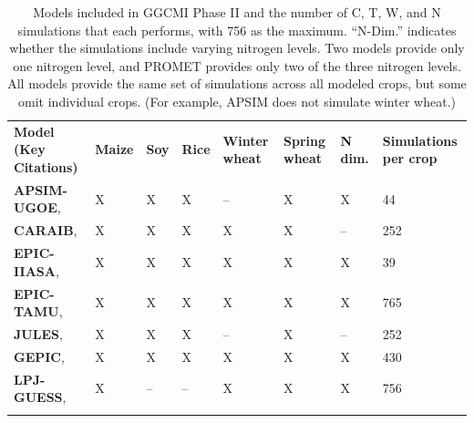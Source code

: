 \documentclass[esd, manuscript]{copernicus} %
\begin{document}
\begin{table}[t]
\caption{Models included in GGCMI Phase II and the number of C, T, W, and N simulations that each performs, with 756 as the maximum. ``N-Dim.'' indicates whether the simulations include varying nitrogen levels. Two models provide only one nitrogen level, and \dag PROMET provides only two of the three nitrogen levels. All models provide the same set of simulations across all modeled crops, but some omit individual crops. (For example, APSIM does not simulate winter wheat.)}
\label{table:models}
	\begin{tabular}{p{6cm} p{1cm} p{1cm} p{1cm} p{1cm} p{1cm} p{1cm} p{1.5cm}}
        \tophline
        {\textbf{Model (Key Citations)}}&{\textbf{Maize}}&{\textbf{Soy}}&{\textbf{Rice}}&{\textbf{Winter wheat}}&{\textbf{Spring wheat}}&{\textbf{N dim.}}&{\textbf{Simulations per crop}}\\ \middlehline
        {\textbf{APSIM-UGOE},    \citet{KEATING2003267, HOLZWORTH2014327}} & {X} & {X} & {X} & {--} & {X} & {X} & {44}\\ \middlehline
        {\textbf{CARAIB},        \citet{Dury2011, Pirttioja2015}} & {X} & {X} & {X} & {X} & {X} & {--} & {252}\\ \middlehline
        {\textbf{EPIC-IIASA},    \citet{BALKOVIC2014}} & {X} & {X} & {X} & {X} & {X} & {X} & {39}\\  \middlehline
        {\textbf{EPIC-TAMU},     \citet{Izaurralde06}} & {X} & {X} & {X} & {X} & {X} & {X} & {765}\\ \middlehline
        {\textbf{JULES},        \citet{Osborne2015, Williams2015, Williams2017}} & {X} & {X} & {X} & {--} & {X} & {--} & {252}\\ \middlehline
        {\textbf{GEPIC},         \citet{LIU2007478, FOLBERTH201221}} & {X} & {X} & {X} & {X} & {X} & {X} & {430}\\ \middlehline
        {\textbf{LPJ-GUESS},     \citet{Lindeskog2013, Olin2015}} & {X} & {--} & {--} & {X} & {X} & {X} & {756}\\  \middlehline

\end{tabular}
\end{table}
\end{document}
